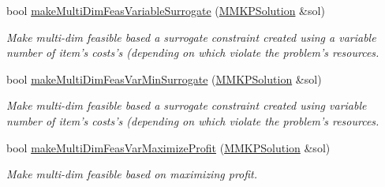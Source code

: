 \begin{DoxyCompactItemize}
bool \hyperlink{class_m_m_k_p___meta_heuristic_ab46e7fb53a209807fb2da72c52c08802}{make\+Multi\+Dim\+Feas\+Variable\+Surrogate} (\hyperlink{class_m_m_k_p_solution}{M\+M\+K\+P\+Solution} \&sol)
\begin{DoxyCompactList}\small\item\em Make multi-\/dim feasible based a surrogate constraint created using a variable number of item's costs's (depending on which violate the problem's resources. \end{DoxyCompactList}\item 
bool \hyperlink{class_m_m_k_p___meta_heuristic_a0997f043cae182ab38950724e5950661}{make\+Multi\+Dim\+Feas\+Var\+Min\+Surrogate} (\hyperlink{class_m_m_k_p_solution}{M\+M\+K\+P\+Solution} \&sol)
\begin{DoxyCompactList}\small\item\em Make multi-\/dim feasible based a surrogate constraint created using variable number of item's costs's (depending on which violate the problem's resources. \end{DoxyCompactList}\item 
bool \hyperlink{class_m_m_k_p___meta_heuristic_a941d76e21887d3c4d98f37bace9d61e5}{make\+Multi\+Dim\+Feas\+Var\+Maximize\+Profit} (\hyperlink{class_m_m_k_p_solution}{M\+M\+K\+P\+Solution} \&sol)
\begin{DoxyCompactList}\small\item\em Make multi-\/dim feasible based on maximizing profit. \end{DoxyCompactList}\end{DoxyCompactItemize}
